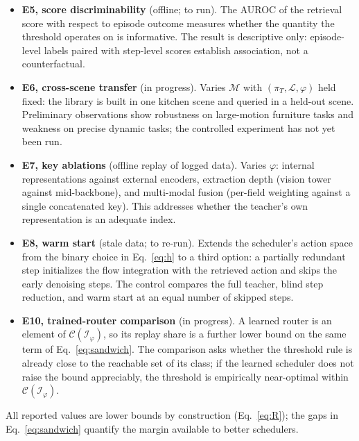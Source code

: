 \documentclass{article}
\begin{document}
\begin{itemize}[leftmargin=1.3em, itemsep=0.35em, topsep=0.3em]
$9$--$12$ steps (P90 up to 52); and $93$--$98\%$ of consecutive hits within a
run retrieve the same library trajectory. The last property explains why long
replay runs are compatible with the failure of composition: the replayed
segment follows a trajectory that previously succeeded, which bounds the
deviation introduced by replacement.
\item \textbf{E5, score discriminability} (offline; to run). The AUROC of the
retrieval score with respect to episode outcome measures whether the quantity
the threshold operates on is informative. The result is descriptive only:
episode-level labels paired with step-level scores establish association, not
a counterfactual.
\item \textbf{E6, cross-scene transfer} (in progress). Varies $\mathcal{M}$
with $(\pi_T, \mathcal{L}, \varphi)$ held fixed: the library is built in one
kitchen scene and queried in a held-out scene. Preliminary observations show
robustness on large-motion furniture tasks and weakness on precise dynamic
tasks; the controlled experiment has not yet been run.
\item \textbf{E7, key ablations} (offline replay of logged data). Varies
$\varphi$: internal representations against external encoders, extraction
depth (vision tower against mid-backbone), and multi-modal fusion (per-field
weighting against a single concatenated key). This addresses whether the
teacher's own representation is an adequate index.
\item \textbf{E8, warm start} (stale data; to re-run). Extends the scheduler's
action space from the binary choice in Eq.~\ref{eq:h} to a third option: a
partially redundant step initializes the flow integration with the retrieved
action and skips the early denoising steps. The control compares the full
teacher, blind step reduction, and warm start at an equal number of skipped
steps.
\item \textbf{E10, trained-router comparison} (in progress). A learned router
is an element of $\mathcal{C}(\mathcal{I}_\varphi)$, so its replay share is a
further lower bound on the same term of Eq.~\ref{eq:sandwich}. The comparison
asks whether the threshold rule is already close to the reachable set of its
class; if the learned scheduler does not raise the bound appreciably, the
threshold is empirically near-optimal within
$\mathcal{C}(\mathcal{I}_\varphi)$.
\end{itemize}
All reported values are lower bounds by construction (Eq.~\ref{eq:R}); the
gaps in Eq.~\ref{eq:sandwich} quantify the margin available to better
schedulers.
\end{document}
